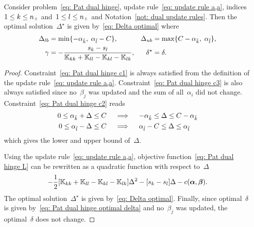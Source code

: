 \begin{lemma}\label{thm: patmat family hinge update a,a}
  Consider problem~\eqref{eq: Pat dual hinge}, update rule~\eqref{eq: update rule a,a}, indices~$1 \leq k \leq n_{+}$ and~$1 \leq l \leq n_{+}$  and Notation~\ref{not: dual update rules}. Then the optimal solution~$\Delta^{\star}$ is given by~\eqref{eq: Delta optimal} where
  \begin{align*}
    \Delta_{lb} & = \min\{- \alpha_{\hat{k}},\; \alpha_{\hat{l}} - C\}, &
    \Delta_{ub} & = \max\{C - \alpha_{\hat{k}},\; \alpha_{\hat{l}}\}, \\
    \gamma & = -\frac{s_k - s_l}{\mathbb{K}_{kk} + \mathbb{K}_{ll} - \mathbb{K}_{kl} - \mathbb{K}_{lk}}, &
    \delta^{\star} & = \delta.
  \end{align*}
\end{lemma}

\begin{proof}
  Constraint~\eqref{eq: Pat dual hinge c1} is always satisfied from the definition of the update rule~\eqref{eq: update rule a,a}. Constraint~\eqref{eq: Pat dual hinge c3} is also always satisfied since no~$\beta_j$ was updated and the sum of all~$\alpha_i$ did not change. Constraint~\eqref{eq: Pat dual hinge c2} reads
  \begin{align*}
    0 \leq \alpha_{\hat{k}} + \Delta \leq C
    & \quad \implies \quad
    - \alpha_{\hat{k}} \leq \Delta \leq C - \alpha_{\hat{k}} \\
    0 \leq \alpha_{\hat{l}} - \Delta \leq C
    & \quad \implies \quad
    \alpha_{\hat{l}} - C \leq \Delta \leq \alpha_{\hat{l}}
  \end{align*}
  which gives the lower and upper bound of~$\Delta.$
  
  Using the update rule~\eqref{eq: update rule a,a}, objective function~\eqref{eq: Pat dual hinge L} can be rewritten as a quadratic function with respect to~$\Delta$
  \begin{equation*}
    - \frac{1}{2} \Brac[s]{\K_{kk} + \K_{ll} - \K_{kl} - \K_{lk}} \Delta^2
    - \Brac[s]{s_k - s_l} \Delta
    - c(\bm{\alpha}, \bm{\beta}).
  \end{equation*}
  The optimal solution~$\Delta^{\star}$ is given by~\eqref{eq: Delta optimal}. Finally, since optimal~$\delta$ is given by~\eqref{eq: Pat dual hinge optimal delta} and no~$\beta_j$ was updated, the optimal~$\delta$ does not change.
\end{proof}

